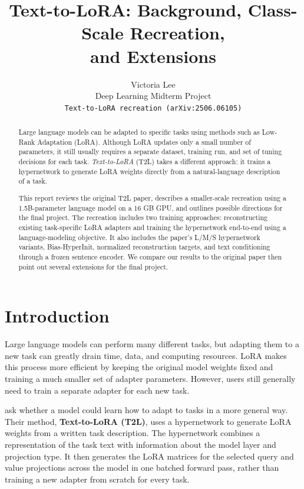 \documentclass{article}
\title{Text-to-LoRA: Background, Class-Scale Recreation,\\and Extensions}
\author{
  Victoria Lee \\
  Deep Learning Midterm Project \\
  \texttt{Text-to-LoRA recreation (arXiv:2506.06105)}
}
\begin{document}
\maketitle

\begin{abstract}
Large language models can be adapted to specific tasks using methods such as Low-Rank Adaptation (LoRA). Although LoRA updates only a small number of parameters, it still usually requires a separate dataset, training run, and set of tuning decisions for each task. \textit{Text-to-LoRA} (T2L) takes a different approach: it trains a hypernetwork to generate LoRA weights directly from a natural-language description of a task.

This report reviews the original T2L paper, describes a smaller-scale recreation using a 1.5B-parameter language model on a 16 GB GPU, and outlines possible directions for the final project. The recreation includes two training approaches: reconstructing existing task-specific LoRA adapters and training the hypernetwork end-to-end using a language-modeling objective. It also includes the paper's L/M/S hypernetwork variants, Bias-HyperInit, normalized reconstruction targets, and text conditioning through a frozen sentence encoder. We compare our results to the original paper then point out several extensions for the final project. 

\end{abstract}

\section{Introduction}

Large language models can perform many different tasks, but adapting them to a new task can greatly drain time, data, and computing resources. LoRA \cite{hu2022lora} makes this process more efficient by keeping the original model weights fixed and training a much smaller set of adapter parameters. However, users still generally need to train a separate adapter for each new task.

\cite{charakorn2025texttolora} ask whether a model could learn how to adapt to tasks in a more general way. Their method, \textbf{Text-to-LoRA (T2L)}, uses a hypernetwork \cite{ha2016hypernetworks} to generate LoRA weights from a written task description. The hypernetwork combines a representation of the task text with information about the model layer and projection type. It then generates the LoRA matrices for the selected query and value projections across the model in one batched forward pass, rather than training a new adapter from scratch for every task.
\end{document}
